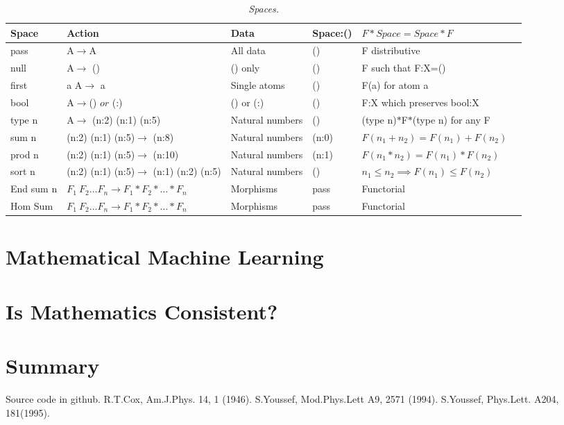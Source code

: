 \documentclass[11pt]{article}
\begin{document}
\begin{table}
\begin{tabular}{| l | l  | l | l | l | l | }
Space & Action & Data & Space:() & $F*Space=Space*F$ \\
\hline 
pass & A$\rightarrow$A & All data & () & F distributive \\
null & A$\rightarrow$ () & () only & () & F such that F:X=() \\
first & a A$\rightarrow$ a & Single atoms & () & F(a) for atom a \\ 
bool & A$\rightarrow$() $or$ (:) & () or (:) & () & F:X which preserves bool:X \\
type n & A$\rightarrow$ (n:2) (n:1) (n:5) & Natural numbers & () & (type n)$*$F$*$(type n) for any F \\
sum n & (n:2) (n:1) (n:5)$\rightarrow$ (n:8) & Natural numbers & (n:0) & $F(n_1+n_2)=F(n_1)+F(n_2)$ \\
prod n & (n:2) (n:1) (n:5)$\rightarrow$ (n:10) & Natural numbers & (n:1) & $F(n_1*n_2)=F(n_1)*F(n_2)$ \\
sort n & (n:2) (n:1) (n:5)$\rightarrow$ (n:1) (n:2) (n:5) & Natural numbers & () & $n_1\le n_2 \implies F(n_1)\le F(n_2)$ \\
End sum n & $F_1\ F_2\dots F_n\rightarrow F_1*F_2*\dots *F_n$ & Morphisms & pass & Functorial \\
Hom Sum & $F_1\ F_2\dots F_n\rightarrow F_1*F_2*\dots *F_n$ & Morphisms & pass & Functorial \\
\hline
\end{tabular} 
\caption{\label{ }{\it Spaces.}}   
\end{table}


\section{Mathematical Machine Learning}
\section{Is Mathematics Consistent?}
\section{Summary}

\begin{thebibliography}{10}
 Source code in github. 
 R.T.Cox, Am.J.Phys. 14, 1 (1946).
 S.Youssef, Mod.Phys.Lett A9, 2571 (1994).
 S.Youssef, Phys.Lett. A204, 181(1995).

\end{thebibliography}
\end{document}
